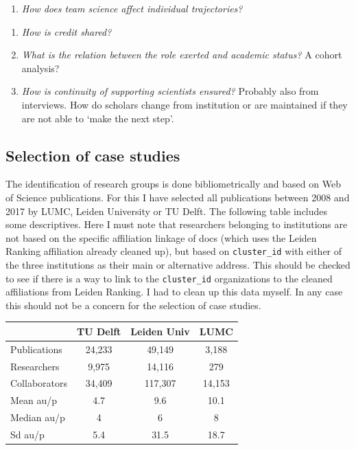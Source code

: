 \documentclass[]{elsarticle} %
\providecommand{\tightlist}{%
  \setlength{\itemsep}{0pt}\setlength{\parskip}{0pt}}
\begin{document}
\begin{enumerate}
\def\labelenumi{\arabic{enumi}.}
\setcounter{enumi}{2}
\tightlist
\item
  \emph{How does team science affect individual trajectories?}
\end{enumerate}

\begin{enumerate}
\def\labelenumi{\roman{enumi}.}
\tightlist
\item
  \emph{How is credit shared?}
\item
  \emph{What is the relation between the role exerted and academic
  status?} A cohort analysis?
\item
  \emph{How is continuity of supporting scientists ensured?} Probably
  also from interviews. How do scholars change from institution or are
  maintained if they are not able to `make the next step'.
\end{enumerate}

\hypertarget{selection-of-case-studies}{%
\subsection{Selection of case studies}\label{selection-of-case-studies}}

The identification of research groups is done bibliometrically and based
on Web of Science publications. For this I have selected all
publications between 2008 and 2017 by LUMC, Leiden University or TU
Delft. The following table includes some descriptives. Here I must note
that researchers belonging to institutions are not based on the specific
affiliation linkage of docs (which uses the Leiden Ranking affiliation
already cleaned up), but based on \texttt{cluster\_id} with either of
the three institutions as their main or alternative address. This should
be checked to see if there is a way to link to the \texttt{cluster\_id}
organizations to the cleaned affiliations from Leiden Ranking. I had to
clean up this data myself. In any case this should not be a concern for
the selection of case studies.

\begin{longtable}[]{@{}lccc@{}}
\toprule
& TU Delft & Leiden Univ & LUMC\tabularnewline
\midrule
\endhead
Publications & 24,233 & 49,149 & 3,188\tabularnewline
Researchers & 9,975 & 14,116 & 279\tabularnewline
Collaborators & 34,409 & 117,307 & 14,153\tabularnewline
Mean au/p & 4.7 & 9.6 & 10.1\tabularnewline
Median au/p & 4 & 6 & 8\tabularnewline
Sd au/p & 5.4 & 31.5 & 18.7\tabularnewline
\bottomrule
\end{longtable}
\end{document}
